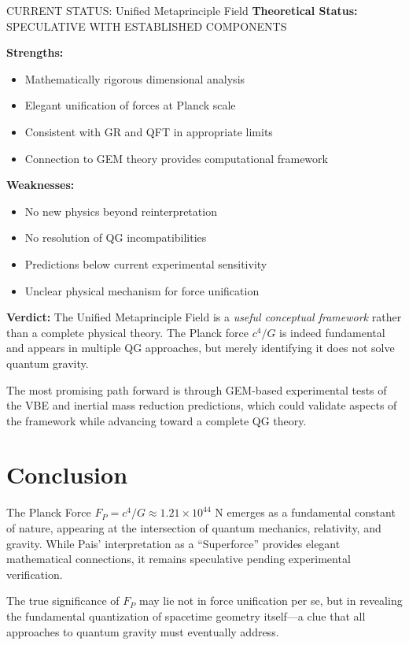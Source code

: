 \begin{factcheck}{CURRENT STATUS: Unified Metaprinciple Field}
\textbf{Theoretical Status:} SPECULATIVE WITH ESTABLISHED COMPONENTS

\textbf{Strengths:}
\begin{itemize}
\item Mathematically rigorous dimensional analysis
\item Elegant unification of forces at Planck scale
\item Consistent with GR and QFT in appropriate limits
\item Connection to GEM theory provides computational framework
\end{itemize}

\textbf{Weaknesses:}
\begin{itemize}
\item No new physics beyond reinterpretation
\item No resolution of QG incompatibilities
\item Predictions below current experimental sensitivity
\item Unclear physical mechanism for force unification
\end{itemize}

\textbf{Verdict:} The Unified Metaprinciple Field is a \textit{useful conceptual framework} rather than a complete physical theory. The Planck force $c^4/G$ is indeed fundamental and appears in multiple QG approaches, but merely identifying it does not solve quantum gravity.

The most promising path forward is through GEM-based experimental tests of the VBE and inertial mass reduction predictions, which could validate aspects of the framework while advancing toward a complete QG theory.
\end{factcheck}

\section{Conclusion}

The Planck Force $F_P = c^4/G \approx 1.21 \times 10^{44}$ N emerges as a fundamental constant of nature, appearing at the intersection of quantum mechanics, relativity, and gravity. While Pais' interpretation as a ``Superforce'' provides elegant mathematical connections, it remains speculative pending experimental verification.

The true significance of $F_P$ may lie not in force unification per se, but in revealing the fundamental quantization of spacetime geometry itself---a clue that all approaches to quantum gravity must eventually address.